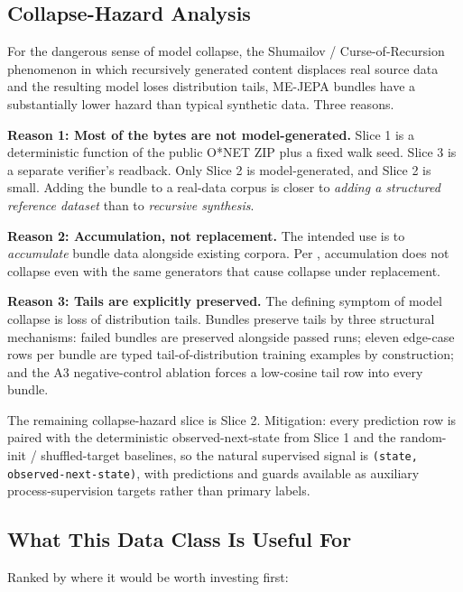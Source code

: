 \documentclass[10pt,twocolumn,letterpaper]{article}
\newcommand{\code}[1]{\texttt{\small #1}}
\begin{document}
\subsection{Collapse-Hazard Analysis}

For the dangerous sense of model collapse, the
Shumailov / Curse-of-Recursion phenomenon in which recursively
generated content displaces real source data and the resulting
model loses distribution tails, ME-JEPA bundles have a
substantially lower hazard than typical synthetic data. Three
reasons.

\textbf{Reason 1: Most of the bytes are not model-generated.}
Slice 1 is a deterministic function of the public O*NET ZIP plus
a fixed walk seed. Slice 3 is a separate verifier's readback. Only
Slice 2 is model-generated, and Slice 2 is small. Adding the bundle
to a real-data corpus is closer to \emph{adding a structured
reference dataset} than to \emph{recursive synthesis}.

\textbf{Reason 2: Accumulation, not replacement.} The intended use
is to \emph{accumulate} bundle data alongside existing corpora.
Per \citet{gerstgrasser2024accumulate}, accumulation does not
collapse even with the same generators that cause collapse under
replacement.

\textbf{Reason 3: Tails are explicitly preserved.} The defining
symptom of model collapse is loss of distribution tails. Bundles
preserve tails by three structural mechanisms: failed bundles are
preserved alongside passed runs; eleven edge-case rows per bundle
are typed tail-of-distribution training examples by construction;
and the A3 negative-control ablation forces a low-cosine tail row
into every bundle.

The remaining collapse-hazard slice is Slice 2. Mitigation: every
prediction row is paired with the deterministic observed-next-state
from Slice 1 and the random-init / shuffled-target baselines, so
the natural supervised signal is
\code{(state, observed-next-state)}, with predictions and guards
available as auxiliary process-supervision targets rather than
primary labels.

\subsection{What This Data Class Is Useful For}

Ranked by where it would be worth investing first:
\end{document}
